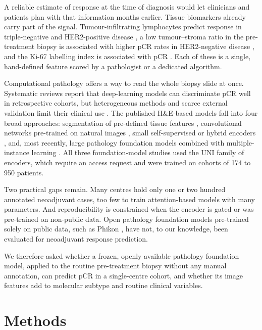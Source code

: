 \documentclass[10pt,a4paper,twocolumn]{article}
\begin{document}
A reliable estimate of response at the time of diagnosis would let clinicians and patients plan with that information months earlier. Tissue biomarkers already carry part of the signal. Tumour-infiltrating lymphocytes predict response in triple-negative and HER2-positive disease \cite{li2022til}, a low tumour--stroma ratio in the pre-treatment biopsy is associated with higher pCR rates in HER2-negative disease \cite{hagenaars2021}, and the Ki-67 labelling index is associated with pCR \cite{tao2017}. Each of these is a single, hand-defined feature scored by a pathologist or a dedicated algorithm.

Computational pathology offers a way to read the whole biopsy slide at once. Systematic reviews report that deep-learning models can discriminate pCR well in retrospective cohorts, but heterogeneous methods and scarce external validation limit their clinical use \cite{krasniqi2025,carlini2026}. The published H\&E-based models fall into four broad approaches: segmentation of pre-defined tissue features \cite{dodington2021,saednia2022,huang2023,aswolinskiy2023,cui2026}, convolutional networks pre-trained on natural images \cite{li2021,li2022,zeng2024,sturm2025}, small self-supervised or hybrid encoders \cite{valderrama2026,lin2026}, and, most recently, large pathology foundation models combined with multiple-instance learning \cite{khan2025,hou2026,zhou2026}. All three foundation-model studies used the UNI family of encoders, which require an access request and were trained on cohorts of 174 to 950 patients.

Two practical gaps remain. Many centres hold only one or two hundred annotated neoadjuvant cases, too few to train attention-based models with many parameters. And reproducibility is constrained when the encoder is gated or was pre-trained on non-public data. Open pathology foundation models pre-trained solely on public data, such as Phikon \cite{filiot2023}, have not, to our knowledge, been evaluated for neoadjuvant response prediction.

We therefore asked whether a frozen, openly available pathology foundation model, applied to the routine pre-treatment biopsy without any manual annotation, can predict pCR in a single-centre cohort, and whether its image features add to molecular subtype and routine clinical variables.

\section{Methods}
\end{document}
